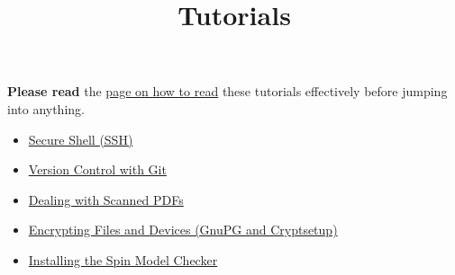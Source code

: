 
\title{Tutorials}
\date{}



\textbf{Please read} the \href{prelim.html}{page on how to read} these tutorials effectively before jumping into anything.

\begin{itemize}
\item \href{ssh.html}{Secure Shell (SSH)}
\item \href{git.html}{Version Control with Git}
\item \href{pdfscan.html}{Dealing with Scanned PDFs}
\item \href{encrypt.html}{Encrypting Files and Devices (GnuPG and Cryptsetup)}
\item \href{spin.html}{Installing the Spin Model Checker}
\end{itemize}



